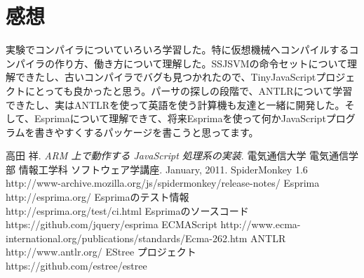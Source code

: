\documentclass[12pt]{article}
\begin{document}
\section{感想}
実験でコンパイラについていろいろ学習した。特に仮想機械へコンパイルするコンパイラの作り方、働き方について理解した。SSJSVMの命令セットについて理解できたし、古いコンパイラでバグも見つかれたので、TinyJavaScriptプロジェクトにとっても良かったと思う。パーサの探しの段階で、ANTLRについて学習できたし、実はANTLRを使って英語を使う計算機も友達と一緒に開発した。そして、Esprimaについて理解できて、将来Esprimaを使って何かJavaScriptプログラムを書きやすくするパッケージを書こうと思ってます。

\newpage
\begin{thebibliography}{9}
高田 祥. \textit{ARM 上で動作する JavaScript 処理系の実装}. 電気通信大学 電気通信学部
情報工学科 ソフトウェア学講座. January, 2011.
SpiderMonkey 1.6 \newline
http://www-archive.mozilla.org/js/spidermonkey/release-notes/
Esprima \newline
http://esprima.org/
Esprimaのテスト情報 \\
http://esprima.org/test/ci.html
Esprimaのソースコード \\
https://github.com/jquery/esprima
ECMAScript \newline
http://www.ecma-international.org/publications/standards/Ecma-262.htm
ANTLR \newline
http://www.antlr.org/
EStree プロジェクト \\
https://github.com/estree/estree
\end{thebibliography}
\end{document}
